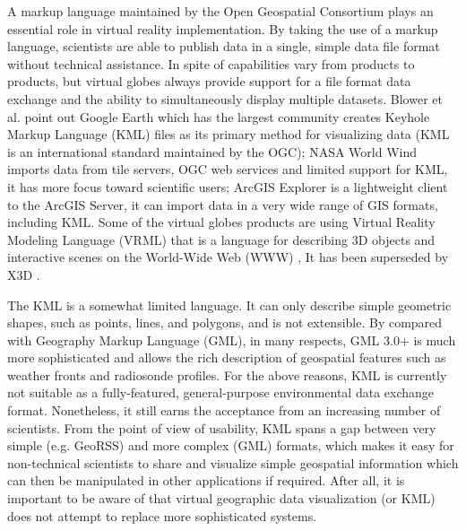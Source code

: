A markup language maintained by the Open Geospatial Consortium \cite{ogc.2016} plays an essential role in virtual reality implementation. By taking the use of a markup language, scientists are able to publish data in a single, simple data file format without technical assistance. In spite of capabilities vary from products to products, but virtual globes always provide support for a file format data exchange and the ability to simultaneously display multiple datasets. Blower et al. point out \cite{blower.sharing-visualizing.2007} Google Earth which has the largest community creates Keyhole Markup Language (KML) \cite{google.kml.2016} files as its primary method for visualizing data (KML is an international standard maintained by the OGC); NASA World Wind \cite{nasa.world-wind.2016} imports data from tile servers, OGC web services and limited support for KML, it has more focus toward scientific users; ArcGIS Explorer \cite{esri.arcgis-explorer.2016} is a lightweight client to the ArcGIS Server, it can import data in a very wide range of GIS formats, including KML. Some of the virtual globes products are using Virtual Reality Modeling Language (VRML) \cite{wiki.vrml.2016} that is a language for describing 3D objects and interactive scenes on the World-Wide Web (WWW) \cite{wiki.www.2016}, It has been superseded by X3D \cite{wiki.x3d.2016}.

The KML is a somewhat limited language. It can only describe simple geometric shapes, such as points, lines, and polygons, and is not extensible. By compared with Geography Markup Language (GML), in many respects, GML 3.0+ is much more sophisticated and allows the rich description of geospatial features such as weather fronts and radiosonde profiles. For the above reasons, KML is currently not suitable as a fully-featured, general-purpose environmental data exchange format. Nonetheless, it still earns the acceptance from an increasing number of scientists. From the point of view of usability, KML spans a gap between very simple (e.g. GeoRSS) and more complex (GML) formats, which makes it easy for non-technical scientists to share and visualize simple geospatial information which can then be manipulated in other applications if required. After all, it is important to be aware of that virtual geographic data visualization (or KML) does not attempt to replace more sophisticated systems.

